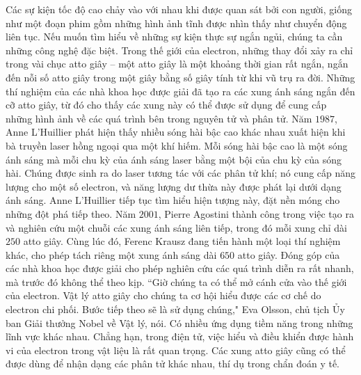 \begin{multicols}{2}
	\vskip 0.1cm
	Các sự kiện tốc độ cao chảy vào với nhau khi được quan sát bởi con người, giống như một đoạn phim gồm những hình ảnh tĩnh được nhìn thấy như chuyển động liên tục. Nếu muốn tìm hiểu về những sự kiện thực sự ngắn ngủi, chúng ta cần những công nghệ đặc biệt. Trong thế giới của electron, những thay đổi xảy ra chỉ trong vài chục atto giây -- một atto giây là một khoảng thời gian rất ngắn, ngắn đến nỗi số atto giây trong một giây bằng số giây tính từ khi vũ trụ ra đời.
	\vskip 0.1cm
	Những thí nghiệm của các nhà khoa học được giải đã tạo ra các xung ánh sáng ngắn đến cỡ atto giây, từ đó cho thấy các xung này có thể được sử dụng để cung cấp những hình ảnh về các quá trình bên trong nguyên tử và phân tử.
	\vskip 0.1cm
	Năm $1987$, Anne L'Huillier phát hiện thấy nhiều sóng hài bậc cao khác nhau xuất hiện khi bà truyền laser hồng ngoại qua một khí hiếm. Mỗi sóng hài bậc cao là một sóng ánh sáng mà mỗi chu kỳ của ánh sáng laser bằng một bội của chu kỳ của sóng hài. Chúng được sinh ra do laser tương tác với các phân tử khí; nó cung cấp năng lượng cho một số electron, và năng lượng dư thừa này được phát lại dưới dạng ánh sáng. Anne L'Huillier tiếp tục tìm hiểu hiện tượng này, đặt nền móng cho những đột phá tiếp theo.
	\vskip 0.1cm
	Năm $2001$, Pierre Agostini thành công trong việc tạo ra và nghiên cứu một chuỗi các xung ánh sáng liên tiếp, trong đó mỗi xung chỉ dài $250$ atto giây. Cùng lúc đó, Ferenc Krausz đang tiến hành một loại thí nghiệm khác, cho phép tách riêng một xung ánh sáng dài $650$ atto giây.
	\vskip 0.1cm
	Đóng góp của các nhà khoa học được giải cho phép nghiên cứu các quá trình diễn ra rất nhanh, mà trước đó không thể theo kịp.
	\vskip 0.1cm
	``Giờ chúng ta có thể mở cánh cửa vào thế giới của electron. Vật lý atto giây cho chúng ta cơ hội hiểu được các cơ chế do electron chi phối. Bước tiếp theo sẽ là sử dụng chúng," Eva Olsson, chủ tịch Ủy ban Giải thưởng Nobel về Vật lý, nói.
	\vskip 0.1cm
	Có nhiều ứng dụng tiềm năng trong những lĩnh vực khác nhau. Chẳng hạn, trong điện tử, việc hiểu và điều khiển được hành vi của electron trong vật liệu là rất quan trọng. Các xung atto giây cũng có thể được dùng để nhận dạng các phân tử khác nhau, thí dụ trong chẩn đoán y tế.
	\begin{figure}[H]
		\vspace*{-5pt}
		\centering
		\captionsetup{labelformat= empty, justification=centering}

\end{figure}
\end{multicols}
